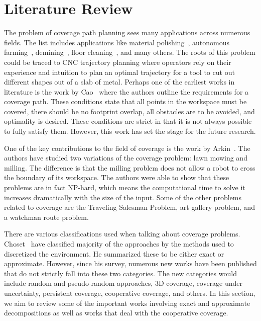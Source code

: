 \documentclass[../main.tex]{subfiles}
\begin{document}
\chapter{Literature Review}
\label{chapter:literature_review}

The problem of coverage path planning sees many applications across numerous fields. The list includes applications like material polishing~\cite{rososhansky2010coverage}, autonomous farming~\cite{ollis1997vision}, demining~\cite{acar2003path}, floor cleaning~\cite{yasutomi1988cleaning}, and many others. The roots of this problem could be traced to CNC trajectory planning where operators rely on their experience and intuition to plan an optimal trajectory for a tool to cut out different shapes out of a slab of metal. Perhaps one of the earliest works in literature is the work by Cao~\cite{cao1988region} where the authors outline the requirements for a coverage path. These conditions state that all points in the workspace must be covered, there should be no footprint overlap, all obstacles are to be avoided, and optimality is desired. These conditions are strict in that it is not always possible to fully satisfy them. However, this work has set the stage for the future research.

One of the key contributions to the field of coverage is the work by Arkin~\cite{arkin2000approximation}. The authors have studied two variations of the coverage problem: lawn mowing and milling. The difference is that the milling problem does not allow a robot to cross the boundary of its workspace. The authors were able to show that these problems are in fact NP-hard, which means the computational time to solve it increases dramatically with the size of the input. Some of the other problems related to coverage are the Traveling Salesman Problem, art gallery problem, and a watchman route problem.

There are various classifications used when talking about coverage problems. Choset~\cite{choset2000coverage} have classified majority of the approaches by the methods used to discretized the environment. He summarized these to be either exact or approximate. However, since his survey, numerous new works have been published that do not strictly fall into these two categories. The new categories would include random and pseudo-random approaches, 3D coverage, coverage under uncertainty, persistent coverage, cooperative coverage, and others. In this section, we aim to review some of the important works involving exact and approximate decompositions as well as works that deal with the cooperative coverage.
\end{document}
